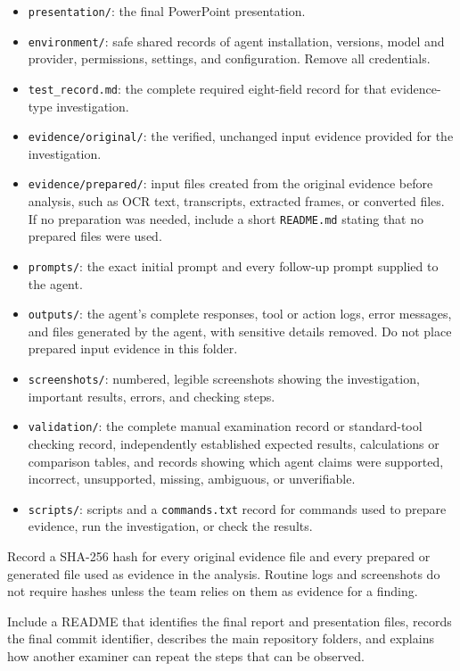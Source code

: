 \documentclass[12pt,letterpaper]{article}
\begin{document}
\begin{description}
\begin{itemize}
              \item \texttt{presentation/}: the final PowerPoint presentation.
              \item \texttt{environment/}: safe shared records of agent installation, versions, model and provider, permissions, settings, and configuration. Remove all credentials.
              \item \texttt{test\_record.md}: the complete required eight-field record for that evidence-type investigation.
              \item \texttt{evidence/original/}: the verified, unchanged input evidence provided for the investigation.
              \item \texttt{evidence/prepared/}: input files created from the original evidence before analysis, such as OCR text, transcripts, extracted frames, or converted files. If no preparation was needed, include a short \texttt{README.md} stating that no prepared files were used.
              \item \texttt{prompts/}: the exact initial prompt and every follow-up prompt supplied to the agent.
              \item \texttt{outputs/}: the agent's complete responses, tool or action logs, error messages, and files generated by the agent, with sensitive details removed. Do not place prepared input evidence in this folder.
              \item \texttt{screenshots/}: numbered, legible screenshots showing the investigation, important results, errors, and checking steps.
              \item \texttt{validation/}: the complete manual examination record or standard-tool checking record, independently established expected results, calculations or comparison tables, and records showing which agent claims were supported, incorrect, unsupported, missing, ambiguous, or unverifiable.
              \item \texttt{scripts/}: scripts and a \texttt{commands.txt} record for commands used to prepare evidence, run the investigation, or check the results.
          \end{itemize}
          Record a SHA-256 hash for every original evidence file and every prepared or generated file used as evidence in the analysis. Routine logs and screenshots do not require hashes unless the team relies on them as evidence for a finding.
    \item[README.] Include a README that identifies the final report and presentation files, records the final commit identifier, describes the main repository folders, and explains how another examiner can repeat the steps that can be observed.

\end{description}
\end{document}
